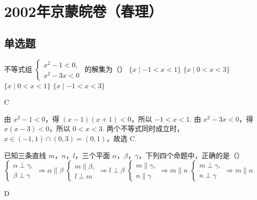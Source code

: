 \chapter{2002年京蒙皖卷（春理）}

\section{单选题}
\begin{problem}
不等式组 \(\begin{cases}
x^{2}-1<0,\\
x^{2}-3x<0
\end{cases}\) 的解集为（\quad）
\choices
    {\(\{x\mid -1<x<1\}\)}
    {\(\{x\mid 0<x<3\}\)}
    {\(\{x\mid 0<x<1\}\)}
    {\(\{x\mid -1<x<3\}\)}
\end{problem}

\begin{answer}
C
\end{answer}

\begin{solution}
由 \(x^{2}-1<0\)，得 \((x-1)(x+1)<0\)，所以 \(-1<x<1\). 由 \(x^{2}-3x<0\)，得 \(x(x-3)<0\)，所以 \(0<x<3\). 两个不等式同时成立时，\(x\in(-1,1)\cap(0,3)=(0,1)\)，故选 C.
\end{solution}

\begin{problem}
已知三条直线 \(m\)，\(n\)，\(l\)，三个平面 \(\alpha\)，\(\beta\)，\(\gamma\)，下列四个命题中，正确的是（\quad）
\choices
    {\(\begin{cases}
\alpha\perp\gamma,\\
\beta\perp\gamma
\end{cases}\Rightarrow\alpha\parallel\beta\)}
    {\(\begin{cases}
m\parallel\beta,\\
l\perp m
\end{cases}\Rightarrow l\perp\beta\)}
    {\(\begin{cases}
m\parallel\gamma,\\
n\parallel\gamma
\end{cases}\Rightarrow m\parallel n\)}
    {\(\begin{cases}
m\perp\gamma,\\
n\perp\gamma
\end{cases}\Rightarrow m\parallel n\)}
\end{problem}

\begin{answer}
D
\end{answer}

